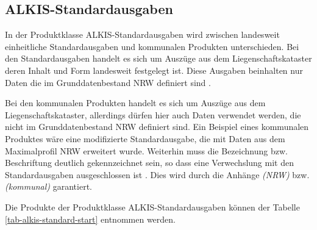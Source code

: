\subsection{ALKIS-Standardausgaben}

In der Produktklasse ALKIS-Standardausgaben wird zwischen landesweit einheitliche Standardausgaben und kommunalen Produkten unterschieden.
Bei den Standardausgaben handelt es sich um Auszüge aus dem Liegenschaftskataster deren Inhalt und Form landesweit festgelegt ist.
Diese Ausgaben beinhalten nur Daten die im Grunddatenbestand NRW definiert sind \autocite[vgl.][8]{bezk-grunddaten}.

Bei den kommunalen Produkten handelt es sich um Auszüge aus dem Liegenschaftskataster, allerdings dürfen hier auch Daten verwendet werden, die nicht im Grunddatenbestand NRW definiert sind.
Ein Beispiel eines kommunalen Produktes wäre eine modifizierte Standardausgabe, die mit Daten aus dem Maximalprofil NRW erweitert wurde.
Weiterhin muss die Bezeichnung bzw. Beschriftung deutlich gekennzeichnet sein, so dass eine Verwechslung mit den Standardausgaben ausgeschlossen ist \autocite[vgl.][9]{bezk-grunddaten}.
Dies wird durch die Anhänge \textit{(NRW)} bzw. \textit{(kommunal)} garantiert.

Die Produkte der Produktklasse ALKIS-Standardausgaben können der Tabelle \ref{tab-alkis-standard-start}  entnommen werden.

